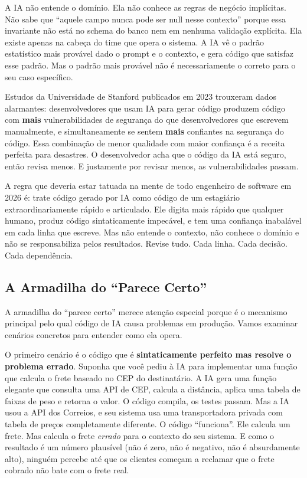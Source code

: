 A IA não entende o domínio. Ela não conhece as regras de negócio implícitas. Não sabe
que ``aquele campo nunca pode ser null nesse contexto'' porque essa invariante não
está no schema do banco nem em nenhuma validação explícita. Ela existe apenas na
cabeça do time que opera o sistema. A IA vê o padrão estatístico mais provável dado
o prompt e o contexto, e gera código que satisfaz esse padrão. Mas o padrão mais
provável não é necessariamente o correto para o seu caso específico.

Estudos da Universidade de Stanford publicados em 2023 trouxeram dados alarmantes:
desenvolvedores que usam IA para gerar código produzem código com \textbf{mais}
vulnerabilidades de segurança do que desenvolvedores que escrevem manualmente, e
simultaneamente se sentem \textbf{mais} confiantes na segurança do código. Essa
combinação de menor qualidade com maior confiança é a receita perfeita para
desastres. O desenvolvedor acha que o código da IA está seguro, então revisa menos.
E justamente por revisar menos, as vulnerabilidades passam.

A regra que deveria estar tatuada na mente de todo engenheiro de software em 2026 é:
trate código gerado por IA como código de um estagiário extraordinariamente rápido
e articulado. Ele digita mais rápido que qualquer humano, produz código
sintaticamente impecável, e tem uma confiança inabalável em cada linha que escreve.
Mas não entende o contexto, não conhece o domínio e não se responsabiliza pelos
resultados. Revise tudo. Cada linha. Cada decisão. Cada dependência.

\subsection{A Armadilha do ``Parece Certo''}

A armadilha do ``parece certo'' merece atenção especial porque é o mecanismo
principal pelo qual código de IA causa problemas em produção. Vamos examinar cenários
concretos para entender como ela opera.

O primeiro cenário é o código que é \textbf{sintaticamente perfeito mas resolve o
problema errado}. Suponha que você pediu à IA para implementar uma função que calcula
o frete baseado no CEP do destinatário. A IA gera uma função elegante que consulta
uma API de CEP, calcula a distância, aplica uma tabela de faixas de peso e retorna
o valor. O código compila, os testes passam. Mas a IA usou a API dos Correios, e seu
sistema usa uma transportadora privada com tabela de preços completamente diferente.
O código ``funciona''. Ele calcula um frete. Mas calcula o frete \textit{errado}
para o contexto do seu sistema. E como o resultado é um número plausível (não é zero,
não é negativo, não é absurdamente alto), ninguém percebe até que os clientes começam
a reclamar que o frete cobrado não bate com o frete real.

